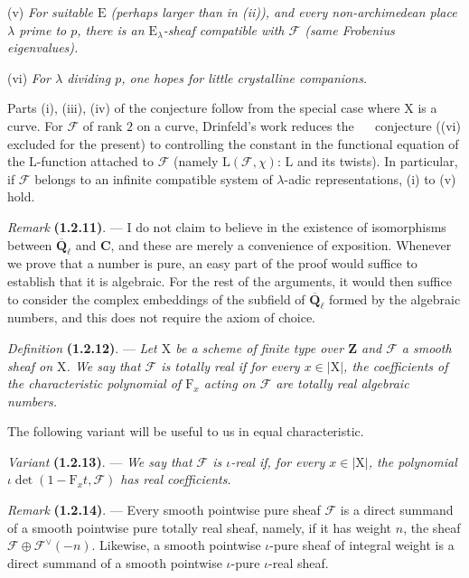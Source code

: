 \documentclass[11pt,leqno]{article}
\newcommand{\Page}[1]{\ifvmode\noindent\else\unskip\ \fi{\footnotesize\textcolor{gray}{[p.\,#1]}}\ \ignorespaces}
\begin{document}
(v) \textit{For suitable \(\mathrm{E}\) (perhaps larger than in \textup{(ii)}), and every non-archimedean place \(\lambda\) prime to \(p\), there is an \(\mathrm{E}_\lambda\)-sheaf compatible with \(\mathscr{F}\) (same Frobenius eigenvalues).}

(vi) \textit{For \(\lambda\) dividing \(p\), one hopes for little crystalline companions.}

Parts (i), (iii), (iv) of the conjecture follow from the special case where \(\mathrm{X}\) is a curve. For \(\mathscr{F}\) of rank \(2\) on a curve, Drinfeld's work reduces the
\Page{156}
conjecture ((vi) excluded for the present) to controlling the constant in the functional equation of the \(\mathrm{L}\)-function attached to \(\mathscr{F}\) (namely \(\mathrm{L}(\mathscr{F},\chi)\): \(\mathrm{L}\) and its twists). In particular, if \(\mathscr{F}\) belongs to an infinite compatible system of \(\lambda\)-adic representations, (i) to (v) hold.

\textit{Remark} \textbf{(1.2.11)}. — I do not claim to believe in the existence of isomorphisms between \(\overline{\mathbf{Q}}_\ell\) and \(\mathbf{C}\), and these are merely a convenience of exposition. Whenever we prove that a number is pure, an easy part of the proof would suffice to establish that it is algebraic. For the rest of the arguments, it would then suffice to consider the complex embeddings of the subfield of \(\overline{\mathbf{Q}}_\ell\) formed by the algebraic numbers, and this does not require the axiom of choice.

\textit{Definition} \textbf{(1.2.12)}. — \textit{Let \(\mathrm{X}\) be a scheme of finite type over \(\mathbf{Z}\) and \(\mathscr{F}\) a smooth sheaf on \(\mathrm{X}\). We say that \(\mathscr{F}\) is \textup{totally real} if for every \(x\in|\mathrm{X}|\), the coefficients of the characteristic polynomial of \(\mathrm{F}_x\) acting on \(\mathscr{F}\) are totally real algebraic numbers.}

The following variant will be useful to us in equal characteristic.

\textit{Variant} \textbf{(1.2.13)}. — \textit{We say that \(\mathscr{F}\) is \(\iota\)-real if, for every \(x\in|\mathrm{X}|\), the polynomial \(\iota\det(1-\mathrm{F}_xt,\mathscr{F})\) has real coefficients.}

\textit{Remark} \textbf{(1.2.14)}. — Every smooth pointwise pure sheaf \(\mathscr{F}\) is a direct summand of a smooth pointwise pure totally real sheaf, namely, if it has weight \(n\), the sheaf \(\mathscr{F}\oplus\mathscr{F}^{\vee}(-n)\). Likewise, a smooth pointwise \(\iota\)-pure sheaf of integral weight is a direct summand of a smooth pointwise \(\iota\)-pure \(\iota\)-real sheaf.
\end{document}
